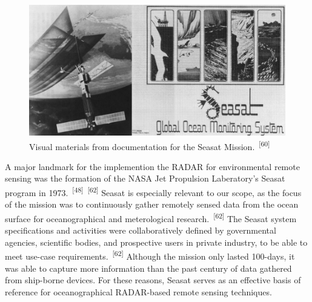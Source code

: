 \documentclass{article}
\begin{document}
\begin{figure}
    \centering
    \includegraphics[width=1\linewidth]{images/seasat-material.png}
    \caption{Visual materials from documentation for the Seasat Mission.~\textsuperscript{[60]}}
    \label{figure16}
\end{figure}


\par{A major landmark for the implemention the RADAR for environmental remote sensing was the formation of the NASA Jet Propulsion Laberatory's Seasat program in 1973.~\textsuperscript{[48]}~\textsuperscript{[62]} Seasat is especially relevant to our scope, as the focus of the mission was to continuously gather remotely sensed data from the ocean surface for oceanographical and meterological research.~\textsuperscript{[62]} The Seasat system specifications and activities were collaboratively defined by governmental agencies, scientific bodies, and prospective users in private industry, to be able to meet use-case requirements.~\textsuperscript{[62]} Although the mission only lasted 100-days, it was able to capture more information than the past century of data gathered from ship-borne devices. For these reasons, Seasat serves as an effective basis of reference for oceanographical RADAR-based remote sensing techniques.}

\end{document}
